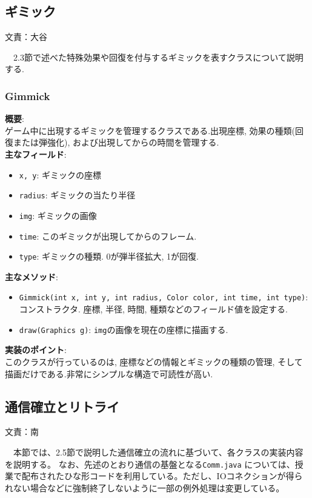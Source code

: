 \documentclass[11pt,a4j]{jarticle}
\begin{document}
\subsection{ギミック}
\begin{flushright}
  文責：大谷
\end{flushright}
　2.3節で述べた特殊効果や回復を付与するギミックを表すクラスについて説明する.
\subsubsection{Gimmick}
\noindent\textbf{概要}: \\
ゲーム中に出現するギミックを管理するクラスである.出現座標, 効果の種類(回復または弾強化), および出現してからの時間を管理する.\\
\noindent\textbf{主なフィールド}:
\begin{itemize}
  \item \texttt{x, y}: ギミックの座標
  \item \texttt{radius}: ギミックの当たり半径
  \item \texttt{img}: ギミックの画像
  \item \texttt{time}: このギミックが出現してからのフレーム.
  \item \texttt{type}: ギミックの種類. 0が弾半径拡大, 1が回復.
\end{itemize}
\noindent\textbf{主なメソッド}:
\begin{itemize}
  \item \texttt{Gimmick(int x, int y, int radius, Color color, int time, int type)}: コンストラクタ. 座標, 半径, 時間, 種類などのフィールド値を設定する.
  \item \texttt{draw(Graphics g)}: \texttt{img}の画像を現在の座標に描画する.
\end{itemize}
\noindent\textbf{実装のポイント}: \vspace{0.1cm}\\
このクラスが行っているのは, 座標などの情報とギミックの種類の管理, そして描画だけである.非常にシンプルな構造で可読性が高い.
\subsection{通信確立とリトライ}
\begin{flushright}
  文責：南
\end{flushright}
　本節では、2.5節で説明した通信確立の流れに基づいて、各クラスの実装内容を説明する。
なお、先述のとおり通信の基盤となる\texttt{Comm.java} については、授業で配布されたひな形コードを利用している。ただし、IOコネクションが得られない場合などに強制終了しないように一部の例外処理は変更している。
\end{document}
